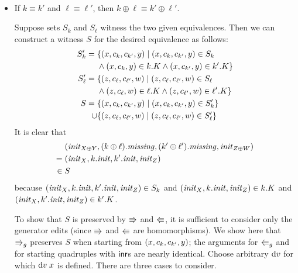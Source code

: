 \begin{pf}\ 
    \begin{itemize}
        \item If $k \equiv k'$ and $\ell \equiv \ell'$, then $k\oplus\ell
            \equiv k'\oplus\ell'$.

            Suppose sets $S_k$ and $S_\ell$ witness the two given
            equivalences. Then we can construct a witness $S$ for the
            desired equivalence as follows:
            \begin{align*}
                S_k' ={}& \{(x,c_k,c_{k'},y) \mid (x,c_k,c_{k'},y) \in S_k \\
                & \land (x,c_k,y) \in k.K \land (x,c_{k'},y) \in k'.K\} \\
                S_\ell' ={}& \{(z,c_\ell,c_{\ell'},w) \mid (z,c_\ell,c_{\ell'},w) \in S_\ell \\
                & \land (z,c_\ell,w) \in \ell.K \land (z,c_{\ell'},w) \in \ell'.K\} \\
                S ={}& \{( x,{c_k},{c_{k'}}, y) \mid
                (x,c_k,c_{k'},y) \in S_k'\} \\
                \cup{}& \{( z,{c_\ell},{c_{\ell'}}, w)
                \mid (z,c_\ell,c_{\ell'},w) \in S_\ell'\}
            \end{align*}
            It is clear that
            \begin{align*}
                & (\mathit{init}_{X \oplus Y},(k\oplus\ell).\mathit{missing},(k'\oplus\ell').\mathit{missing},\mathit{init}_{Z \oplus W}) \\
            ={} & ({\mathit{init}_X},{k.\mathit{init}},{k'.\mathit{init}},{\mathit{init}_Z}) \\
            \in{} & S
            \end{align*}
            because $(\mathit{init}_X,k.\mathit{init},k'.\mathit{init},\mathit{init}_Z) \in S_k$ and
            $(\mathit{init}_X,k.\mathit{init},\mathit{init}_Z) \in k.K$ and
            $(\mathit{init}_X,k'.\mathit{init},\mathit{init}_Z) \in k'.K$.

            To show that $S$ is preserved by $\mathord{\Rrightarrow}$ and $\mathord{\Lleftarrow}$, it is
            sufficient to consider only the generator edits (since $\mathord{\Rrightarrow}$
            and $\mathord{\Lleftarrow}$ are homomorphisms). We show here that $\mathord{\Rrightarrow}_g$
            preserves $S$ when starting from $(
            x,{c_k},{c_{k'}}, y)$; the arguments for
            $\mathord{\Lleftarrow}_g$ and for starting quadruples with $\mathsf{inr}$s are
            nearly identical. Choose arbitrary $\textrm{d} v$ for which $\textrm{d} v\;
            x$ is defined. There are three cases to consider.


\end{itemize}
\end{pf}
